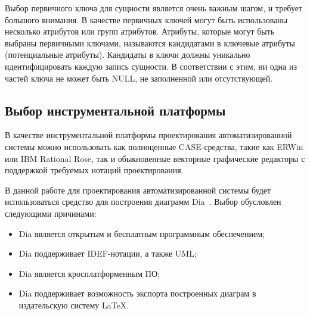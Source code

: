 Выбор первичного ключа для сущности является очень важным шагом,
и требует большого внимания. В качестве первичных ключей могут быть
использованы несколько атрибутов или групп атрибутов. Атрибуты, которые
могут быть выбраны первичными ключами, называются кандидатами в
ключевые атрибуты (потенциальные атрибуты). Кандидаты в ключи должны
уникально идентифицировать каждую запись сущности. В соответствии с
этим, ни одна из частей ключа не может быть NULL, не заполненной или
отсутствующей.

\pagebreak
\subsection{Выбор инструментальной платформы}

В качестве инструментальной платформы проектирования автоматизированной
системы можно использовать как полноценные CASE-средства, такие как ERWin или
IBM Rational Rose, так и обыкновенные векторные графические редакторы с поддержкой
требуемых нотаций проектирования.

В данной работе для проектирования автоматизированной системы будет
использоваться средство для построения диаграмм Dia~\cite{website_dia}. Выбор обусловлен
следующими причинами:
\begin{itemize}
  \item Dia является открытым и бесплатным программным обеспечением;
  \item Dia поддерживает IDEF-нотации, а также UML;
  \item Dia является кросплатформенным ПО;
  \item Dia поддерживает возможность экспорта построенных диаграм в
    издательскую систему LaTeX.
\end{itemize}